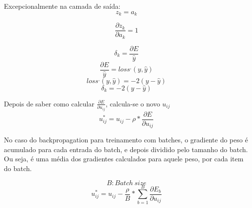 \documentclass{article}
\begin{document}
\noindent Excepcionalmente na camada de saída:
\[ z_k = a_k \]

\[ \frac{\partial z_k}{\partial a_k} = 1 \]

\[ \delta_k = \frac{\partial E}{\hat{y}} \]
\[ \frac{\partial E}{\hat{y}} = loss^{,}(y, \hat{y}) \]
\[ loss^{,}(y, \hat{y}) = -2(y - \hat{y}) \]
\[ \delta_k = -2(y - \hat{y}) \]


\vspace{4pc}

\noindent Depois de saber como calcular ${\frac{\partial E}{\partial u_{ij}}}$, calcula-se o novo ${u_{ij}}$
\[u^*_{ij} = u_{ij} - \rho * \frac{\partial E}{\partial u_{ij}} \]

No caso do backpropagation para treinamento com batches, o gradiente do peso é acumulado para cada entrada do batch, e depois dividido pelo tamanho do batch. Ou seja, é uma média dos gradientes calculados para aquele peso, por cada item do batch.

\[B : Batch\ size \]
\[u^*_{ij} = u_{ij} - \frac{\rho}{B} * \sum_{b=1}^{B} \frac{\partial E_b}{\partial u_{ij}} \]
\end{document}
